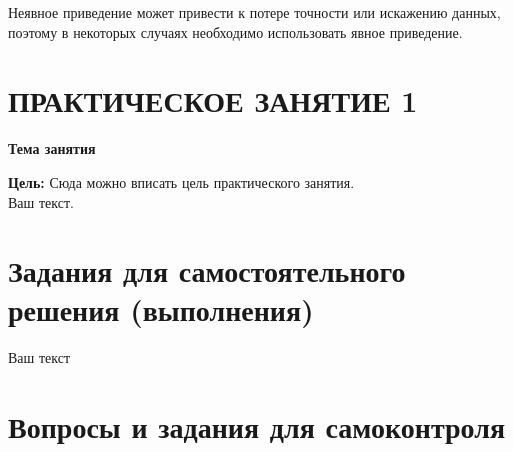 Неявное приведение может привести к потере точности или искажению данных, поэтому в некоторых случаях необходимо использовать явное приведение.
\newpage%
\section*{ПРАКТИЧЕСКОЕ ЗАНЯТИЕ 1}%
 \vspace{-10pt}%
\begin{center}%
 {\bf%
 Тема занятия}
\end{center}%

{\bf Цель:} Сюда можно вписать цель практического занятия.
\\%

Ваш текст.

\newpage%
\section*{Задания для самостоятельного решения (выполнения)}%

Ваш текст

\newpage%



\section*{Вопросы и задания для самоконтроля}%

